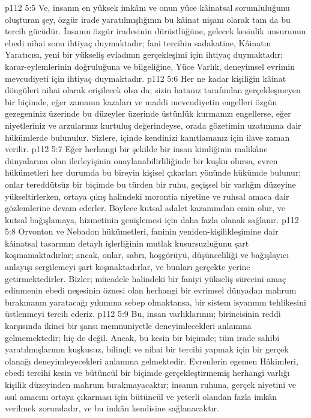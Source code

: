 \vs p112 5:5 Ve, insanın en yüksek imkânı ve onun yüce kâinatsal sorumluluğunu oluşturan şey, özgür irade yaratılmışlığının bu kâinat nişanı olarak tam da bu tercih gücüdür. İnsanın özgür iradesinin dürüstlüğüne, gelecek kesinlik unsurunun ebedi nihai sonu ihtiyaç duymaktadır; fani tercihin sadakatine, Kâinatın Yaratıcısı, yeni bir yükseliş evladının gerçekleşimi için ihtiyaç duymaktadır; karar\hyp{}eylemlerinin doğruluğuna ve bilgeliğine, Yüce Varlık, deneyimsel evrimin mevcudiyeti için ihtiyaç duymaktadır.
\vs p112 5:6 Her ne kadar kişiliğin kâinat döngüleri nihai olarak erişilecek olsa da; sizin hatanız tarafından gerçekleşmeyen bir biçimde, eğer zamanın kazaları ve maddi mevcudiyetin engelleri özgün gezegeniniz üzerinde bu düzeyler üzerinde üstünlük kurmanızı engellerse, eğer niyetleriniz ve arzularınız kurtuluş değerindeyse, orada gözetimin uzatımına dair hükümlerde bulunulur. Sizlere, içinde kendinizi kanıtlamanız için ilave zaman verilir.
\vs p112 5:7 Eğer herhangi bir şekilde bir insan kimliğinin malikâne dünyalarına olan ilerleyişinin onaylanabilirliliğinde bir kuşku olursa, evren hükümetleri her durumda bu bireyin kişisel çıkarları yönünde hükümde bulunur; onlar tereddütsüz bir biçimde bu türden bir ruhu, geçişsel bir varlığın düzeyine yükseltirlerken, ortaya çıkış halindeki morontia niyetine ve ruhsal amaca dair gözlemlerine devam ederler. Böylece kutsal adalet kazanımdan emin olur, ve kutsal bağışlamaya, hizmetinin genişlemesi için daha fazla olanak sağlanır.
\vs p112 5:8 Orvonton ve Nebadon hükümetleri, faninin yeniden\hyp{}kişilikleşimine dair kâinatsal tasarımın detaylı işlerliğinin mutlak kusursuzluğunu şart koşmamaktadırlar; ancak, onlar, sabrı, hoşgörüyü, düşünceliliği ve bağışlayıcı anlayışı sergilemeyi şart koşmaktadırlar, ve bunları gerçekte yerine getirmektedirler. Bizler; mücadele halindeki bir faniyi yükseliş sürecini amaç edinmenin ebedi neşesinin öznesi olan herhangi bir evrimsel dünyadan mahrum bırakmanın yaratacağı yıkımına sebep olmaktansa, bir sistem isyanının tehlikesini üstlenmeyi tercih ederiz.
\vs p112 5:9 Bu, insan varlıklarının; birincisinin reddi karşısında ikinci bir şansı memnuniyetle deneyimlecekleri anlamına gelmemektedir; hiç de değil. Ancak, bu kesin bir biçimde; tüm irade sahibi yaratılmışlarının kuşkusuz, bilinçli ve nihai bir tercihi yapmak için bir gerçek olanağı deneyimleyecekleri anlamına gelmektedir. Evrenlerin egemen Hâkimleri, ebedi tercihi kesin ve bütüncül bir biçimde gerçekleştirmemiş herhangi varlığı kişilik düzeyinden mahrum bırakmayacaktır; insanın ruhuna, gerçek niyetini ve asıl amacını ortaya çıkarması için bütüncül ve yeterli olandan fazla imkân verilmek zorundadır, ve bu imkân kendisine sağlanacaktır.
